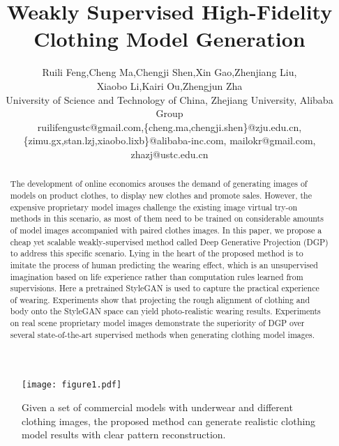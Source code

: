 \documentclass[10pt,twocolumn,letterpaper]{article}
\begin{document}
\title{Weakly Supervised High-Fidelity Clothing Model Generation}

 \author{Ruili Feng,Cheng Ma,Chengji Shen,Xin Gao,Zhenjiang Liu,\\
 Xiaobo Li,Kairi Ou,Zhengjun Zha\\
 University of Science and Technology of China, Zhejiang University, Alibaba Group \\
 ruilifengustc@gmail.com,\{cheng.ma,chengji.shen\}@zju.edu.cn, \\ \{zimu.gx,stan.lzj,xiaobo.lixb\}@alibaba-inc.com, mailokr@gmail.com, zhazj@ustc.edu.cn
 }





\maketitle




\begin{abstract}
  The development of online economics arouses the demand of generating images of models on product clothes, to display new clothes and promote sales. However, the expensive  proprietary model images challenge the existing image virtual try-on methods in this scenario, as most of them need to be trained on considerable amounts of model images accompanied with paired clothes images. In this paper, we propose a cheap yet scalable weakly-supervised method called Deep Generative Projection (DGP) to address this specific scenario. Lying in the heart of the proposed method is to imitate the process of human predicting the wearing effect, which is an unsupervised imagination based on life experience rather than computation rules learned from supervisions. Here a pretrained StyleGAN is used to capture the practical experience of wearing. Experiments show that projecting the rough alignment of clothing and body onto the StyleGAN space can yield photo-realistic wearing results. Experiments on real scene proprietary model images demonstrate the superiority of DGP over several state-of-the-art supervised methods when generating clothing model images.
\end{abstract}



\begin{figure}[t]
  \centering
  \texttt{[image: figure1.pdf]}
  \caption{Given a set of commercial models with underwear and different clothing images, the proposed method can generate realistic clothing model results with clear pattern reconstruction.}\label{fig:teaser}
\end{figure}
\end{document}
